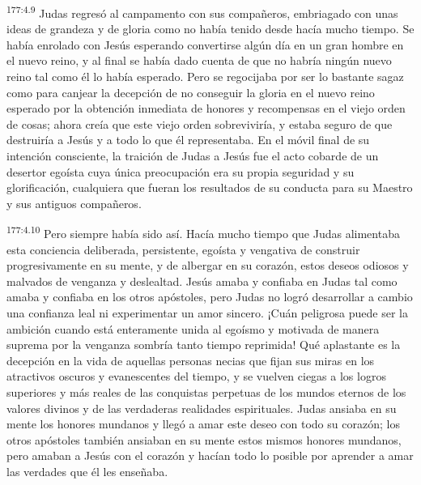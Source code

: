 \par 
\textsuperscript{177:4.9} Judas regresó al campamento con sus compañeros, embriagado con unas ideas de grandeza y de gloria como no había tenido desde hacía mucho tiempo. Se había enrolado con Jesús esperando convertirse algún día en un gran hombre en el nuevo reino, y al final se había dado cuenta de que no habría ningún nuevo reino tal como él lo había esperado. Pero se regocijaba por ser lo bastante sagaz como para canjear la decepción de no conseguir la gloria en el nuevo reino esperado por la obtención inmediata de honores y recompensas en el viejo orden de cosas; ahora creía que este viejo orden sobreviviría, y estaba seguro de que destruiría a Jesús y a todo lo que él representaba. En el móvil final de su intención consciente, la traición de Judas a Jesús fue el acto cobarde de un desertor egoísta cuya única preocupación era su propia seguridad y su glorificación, cualquiera que fueran los resultados de su conducta para su Maestro y sus antiguos compañeros.

\par 
\textsuperscript{177:4.10} Pero siempre había sido así. Hacía mucho tiempo que Judas alimentaba esta conciencia deliberada, persistente, egoísta y vengativa de construir progresivamente en su mente, y de albergar en su corazón, estos deseos odiosos y malvados de venganza y deslealtad. Jesús amaba y confiaba en Judas tal como amaba y confiaba en los otros apóstoles, pero Judas no logró desarrollar a cambio una confianza leal ni experimentar un amor sincero. ¡Cuán peligrosa puede ser la ambición cuando está enteramente unida al egoísmo y motivada de manera suprema por la venganza sombría tanto tiempo reprimida! Qué aplastante es la decepción en la vida de aquellas personas necias que fijan sus miras en los atractivos oscuros y evanescentes del tiempo, y se vuelven ciegas a los logros superiores y más reales de las conquistas perpetuas de los mundos eternos de los valores divinos y de las verdaderas realidades espirituales. Judas ansiaba en su mente los honores mundanos y llegó a amar este deseo con todo su corazón; los otros apóstoles también ansiaban en su mente estos mismos honores mundanos, pero amaban a Jesús con el corazón y hacían todo lo posible por aprender a amar las verdades que él les enseñaba.

